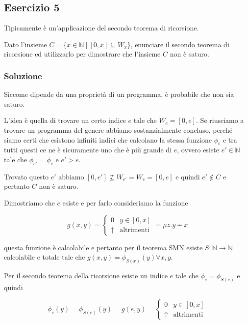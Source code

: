 
\subsection{Esercizio 5}

Tipicamente è un'applicazione del secondo teorema di ricorsione.

Dato l'insieme $C = \{ x \in \mathbb{N} \: | \: [0,x] \subseteq W_x \} $, enunciare il secondo teorema di ricorsione ed utilizzarlo per dimostrare che l'insieme $C$ non è saturo.

\subsubsection{Soluzione}

Siccome dipende da una proprietà di un programma, è probabile che non sia saturo.

L'idea è quella di trovare un certo indice $e$ tale che $W_e = [0,e]$. Se riusciamo a trovare un programma del genere abbiamo sostanzialmente concluso, perché siamo certi che esistono infiniti indici che calcolano la stessa funzione $\phi_e$ e tra tutti questi ce ne è sicuramente uno che è più grande di $e$, ovvero esiste $e' \in \mathbb{N}$ tale che $\phi_{e'} = \phi_e$ e $e' > e$.

Trovato questo $e'$ abbiamo $[0, e'] \nsubseteq W_{e'} = W_e = [0,e]$ e quindi $e' \notin C$ e pertanto $C$ non è saturo.

Dimostriamo che $e$ esiste e per farlo consideriamo la funzione

$$
g(x,y) = \begin{cases}
0 & y \in [0,x] \\
\uparrow &\text{altrimenti}
\end{cases} = \mu z . y \dotminus x
$$

questa funzione è calcolabile e pertanto per il teorema SMN esiste $S : \mathbb{N} \rightarrow \mathbb{N}$ calcolabile e totale tale che $g(x,y) = \phi_{S(x)}(y) \forall x,y$.

Per il secondo teorema della ricorsione esiste un indice $e$ tale che $\phi_e = \phi_{S(e)}$ e quindi

$$
\phi_e(y) = \phi_{S(e)}(y) = g(e,y) = \begin{cases}
0 & y \in [0,x] \\
\uparrow &\text{altrimenti}
\end{cases}
$$
 
